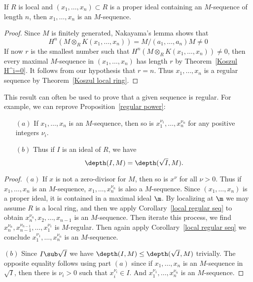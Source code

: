 \begin{corollary}\label{local regular seq}
If $R$ is local and $(x_1,\dots,x_n)\subset R$ is a proper ideal containing
an $M$-sequence of length $n$, then $x_1,\dots,x_n$ is an $M$-sequence.
\end{corollary}
\begin{proof}
Since $M$ is finitely generated, Nakayama's lemma shows that
\[H^n(M\otimes_RK(x_1,\dots,x_n))=M/(a_1,\dots,a_n)M\neq 0\]
If now $r$ is the smallest number such that $H^n(M\otimes_RK(x_1,\dots,x_n))\neq 0$, then every maximal $M$-sequence in $(x_1,\dots,x_n)$ has length $r$ by Theorem~\ref{Koszul H^i=0}. It follows from our hypothesis that $r=n$. Thus $x_1,\dots,x_n$ is a regular sequence by Theorem~\ref{Koszul local ring}.
\end{proof}
This result can often be used to prove that a given sequence is regular.
For example, we can reprove Proposition~\ref{regular power}:
\begin{corollary}\label{depth geometric}
\mbox{}
\begin{itemize}
\item[$(a)$]If $x_1,\dots,x_n$ is an $M$-sequence, then so is $x_1^{\nu_1},\dots,x_n^{\nu_n}$ for any positive integers $\nu_i$.
\item[$(b)$]Thus if $I$ is an ideal of $R$, we have 
\[\depth(I,M)=\depth(\sqrt{I},M).\]
\end{itemize}
\end{corollary}
\begin{proof}
$(a)$ If $x$ is not a zero-divisor for $M$, then so is $x^\nu$ for all $\nu>0$. Thus if $x_1,\dots,x_n$ is an $M$-sequence, $x_1,\dots,x_n^{\nu_n}$ is also a $M$-sequence. Since $(x_1,\dots,x_n)$ is a proper ideal, it is contained in a maximal ideal $\m$. By localizing at $\m$ we may assume $R$ is a local ring, and then we apply Corollary~\ref{local regular seq} to obtain $x_n^{\nu_n},x_{2},\dots,x_{n-1}$ is an $M$-sequence. Then iterate this process, we find $x_{n}^{\nu_n},x_{n-1}^{\nu_{n-1}},\dots,x_1^{\nu_1}$ is $M$-regular. Then again apply Corollary~\ref{local regular seq} we conclude $x_1^{\nu_1},\dots,x_{n}^{\nu_n}$ is an $M$-sequence.\par
$(b)$ Since $I\sub\sqrt{I}$ we have $\depth(I,M)\leq\depth(\sqrt{I},M)$ trivially. The opposite equality follows using part $(a)$ since if $x_1,\dots,x_n$ is an $M$-sequence in $\sqrt{I}$, then there is $\nu_i>0$ such that $x_i^{\nu_i}\in I$. And $x_1^{\nu_1},\dots,x_n^{\nu_n}$ is an $M$-sequence.
\end{proof}
